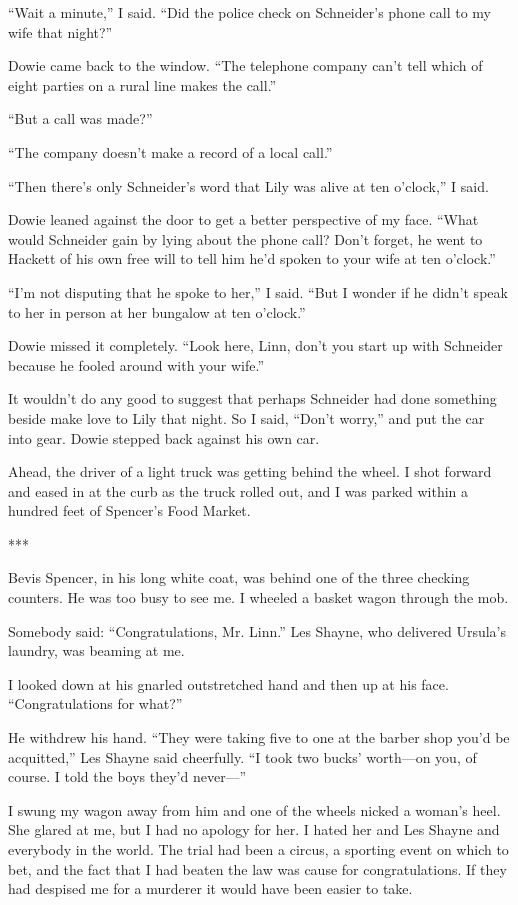 \documentclass{novel}
\begin{document}
“Wait a minute,” I said. “Did the police check on Schneider’s phone call to my wife that night?”

Dowie came back to the window. “The telephone company can’t tell which of eight parties on a rural line makes the call.”

“But a call was made?”

“The company doesn’t make a record of a local call.”

“Then there’s only Schneider’s word that Lily was alive at ten o’clock,” I said.

Dowie leaned against the door to get a better perspective of my face. “What would Schneider gain by lying about the phone call? Don’t forget, he went to Hackett of his own free will to tell him he’d spoken to your wife at ten o’clock.”

“I’m not disputing that he spoke to her,” I said. “But I wonder if he didn’t speak to her in person at her bungalow at ten o’clock.”

Dowie missed it completely. “Look here, Linn, don’t you start up with Schneider because he fooled around with your wife.”

It wouldn’t do any good to suggest that perhaps Schneider had done something beside make love to Lily that night. So I said, “Don’t worry,” and put the car into gear. Dowie stepped back against his own car.

Ahead, the driver of a light truck was getting behind the wheel. I shot forward and eased in at the curb as the truck rolled out, and I was parked within a hundred feet of Spencer’s Food Market.

***

Bevis Spencer, in his long white coat, was behind one of the three checking counters. He was too busy to see me. I wheeled a basket wagon through the mob.

Somebody said: “Congratulations, Mr. Linn.” Les Shayne, who delivered Ursula’s laundry, was beaming at me.

I looked down at his gnarled outstretched hand and then up at his face. “Congratulations for what?”

He withdrew his hand. “They were taking five to one at the barber shop you’d be acquitted,” Les Shayne said cheerfully. “I took two bucks’ worth—on you, of course. I told the boys they’d never—”

I swung my wagon away from him and one of the wheels nicked a woman’s heel. She glared at me, but I had no apology for her. I hated her and Les Shayne and everybody in the world. The trial had been a circus, a sporting event on which to bet, and the fact that I had beaten the law was cause for congratulations. If they had despised me for a murderer it would have been easier to take.
\end{document}
